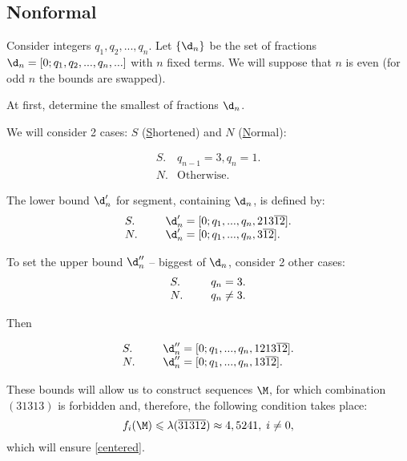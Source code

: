 \subsection{Nonformal}
\label{sbsc:boundaries_nonformal}

Consider integers $q_1, q_2, ..., q_n$.
Let $\{\d_n\}$ be the set of fractions
$\d_n = [0; q_1, q_2, ..., q_n, ...]$ with $n$ fixed terms.
We will suppose that $n$ is even (for odd $n$ the bounds are swapped).

At first, determine the smallest of fractions $\d_n$.

We will consider 2 cases: $S$
(\underline{S}hortened) and $N$ (\underline{N}ormal):

\begin{equation}
	\label{left_shortened_normal}
	\begin{array}{ll}
		S. & q_{n-1} = 3, q_n = 1. \\
		N. & \text{Otherwise.}
	\end{array}
\end{equation}

The lower bound $\d_n'$ for segment, containing $\d_n$, is defined by:
\begin{equation}
	\begin{array}{ll}
		S. & \hspace*{15pt} \d_n' = [0; q_1, ..., q_n, 213\overline{12}]. \\
		N. & \hspace*{15pt} \d_n' = [0; q_1, ..., q_n, 3\overline{12}].
	\end{array}
\end{equation}

To set the upper bound $\d_n''$ -- biggest of $\d_n$, consider 2 other cases:
\begin{equation}
	\begin{array}{ll}
		S. & \hspace*{15pt} q_{n} = 3.\\
		N. & \hspace*{15pt} q_{n} \ne 3.
	\end{array}
\end{equation}

Then

\begin{equation}
	\begin{array}{ll}
		S. & \hspace*{15pt} \d_n'' = [0; q_1, ..., q_n, 1213\overline{12}]. \\
		N. & \hspace*{15pt} \d_n'' = [0; q_1, ..., q_n, 13\overline{12}].
	\end{array}
\end{equation}

These bounds will allow us to construct sequences $\M$,
for which combination $(31313)$ is forbidden and, therefore,
the following condition takes place:
\begin{equation}
	f_i(\M) \leqslant \lambda(\overline{31312}) \approx 4,5241, \;
	i \ne 0,
\end{equation}
which will ensure \ref{centered}.
